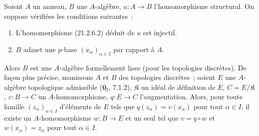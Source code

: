 \begin{theorem}[21.2.7]
\label{0.21.2.7-fr}
Soient $A$ un anneau, $B$ une $A$-algèbre, $u:A\to B$ l'homomorphisme
structural. On suppose vérifiées les conditions suivantes~:
\begin{enumerate}
  \item[\textup{(i)}] L'homomorphisme \textup{(21.2.6.2)} déduit de $u$ est injectif.
  \item[\textup{(ii)}] $B$ admet une $p$-base $(x_\alpha)_{\alpha\in I}$ par rapport à $A$.
\end{enumerate}

Alors $B$ est une $A$-algèbre formellement lisse (pour les topologies
discrètes). De façon plus précise, munissons $A$ et $B$ des topologies
discrètes~; soient $E$ une $A$-algèbre topologique admissible
\textup{($\mathbf{0}_{\mathrm I}$, 7.1.2)}, $\mathfrak K$ un idéal de définition de $E$, $C=E/\mathfrak K$,
$v:B\to C$ un $A$-homomorphisme, $q:E\to C$ l'augmentation. Alors, pour
toute famille $(z_\alpha)_{\alpha\in I}$ d'éléments de $E$ tels que
$q(z_\alpha)=v(x_\alpha)$ pour tout $\alpha\in I$, il existe un
$A$-homomorphisme $w:B\to E$ et un seul tel que $v=q\circ w$ et
$w(x_\alpha)=z_\alpha$ pour tout $\alpha\in I$.
\end{theorem}

